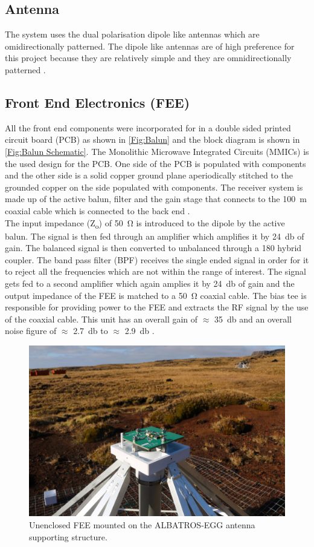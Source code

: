 \documentclass{ws-jai}
\begin{document}
\subsection{Antenna}	
The system uses the dual polarisation dipole like antennas which are omidirectionally patterned. The dipole like antennas are of high preference for this project because they are relatively simple and they are omnidirectionally patterned \cite{Memo28}.

\subsection{Front End Electronics (FEE)}
All the front end components were incorporated for in a double sided printed circuit board (PCB) as shown in \autoref{Fig:Balun} and the block diagram is shown in \autoref{Fig:Balun Schematic}. The Monolithic Microwave Integrated Circuits (MMICs) is the used design for the PCB. One side of the PCB is populated with components and the other side is a solid copper ground plane aperiodically stitched to the grounded copper on the side populated with components. The receiver system is made up of the active balun, filter and the gain stage that connects to the \SI{100}{\metre} coaxial cable which is connected to the back end \cite{2012PASP..124.1090H}.\\ 
The input impedance (Z\textsubscript{o}) of \SI{50}{\ohm} is introduced to the dipole by the active balun. The signal is then fed through an amplifier which amplifies it by \SI{+24}{\decibel} of gain. The balanced signal is then converted to unbalanced through a 180 \degree hybrid coupler. The band pass filter (BPF) receives the single ended signal in order for it to reject all the frequencies which are not within the range of interest. The signal gets fed to a second amplifier which again amplies it by \SI{+24}{\decibel} of gain and the output impedance of the FEE is matched to a \SI{50}{\ohm} coaxial cable. The bias tee is responsible for providing power to the FEE and extracts the RF signal by the use of the coaxial cable. This unit has an overall gain of $\approx$ \SI{35}{\decibel} and an overall noise figure of $\approx$ \SI{2.7}{\decibel} to $\approx$ \SI{2.9}{\decibel} \cite{Memo35}.

\begin{figure}[h]
	\begin{center}
		\includegraphics[width=0.5\linewidth]{Figures/balun.jpg}
		\caption{Unenclosed FEE mounted on the ALBATROS-EGG antenna supporting structure.} 
		\label{Fig:Balun}
	\end{center}
\end{figure}
\end{document}
